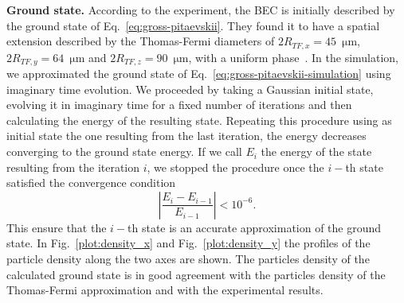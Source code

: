\noindent \textbf{Ground state.} According to the experiment, the BEC is initially described by the ground state  of Eq.~\eqref{eq:gross-pitaevskii}. They found it to have a spatial extension described by the Thomas-Fermi diameters of $2R_{TF, x} = 45$~$\mathrm{\mu m}$, $2R_{TF, y} = 64 $~$ \mathrm{\mu m}$ and $2R_{TF, z} = 90 $~$ \mathrm{\mu m}$, with a uniform phase~\citep{DGPS99}.
In the simulation, we approximated the ground state of Eq.~\eqref{eq:gross-pitaevskii-simulation} using imaginary time evolution. We proceeded by taking a Gaussian initial state, evolving it in imaginary time for a fixed number of iterations and then calculating the energy of the resulting state. Repeating this procedure using as initial state the one resulting from the last iteration, the energy decreases converging to the ground state energy. If we call $E_i$ the energy of the state resulting from the iteration $i$, we stopped the procedure once the $i-$th state satisfied the convergence condition
\begin{equation}
\left| \frac{E_{i} - E_{i-1}}{E_{i-1}} \right| < 10^{-6}.
\end{equation}
This ensure that the $i-$th state is an accurate approximation of the ground state. In Fig.~\ref{plot:density_x} and Fig.~\ref{plot:density_y} the profiles of the particle density along the two axes are shown. The particles density of the calculated ground state is in good agreement with the particles density of the Thomas-Fermi approximation and with the experimental results.
